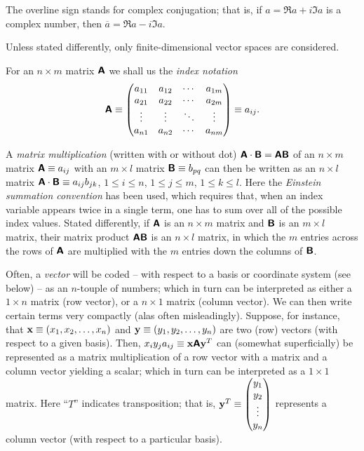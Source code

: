 The overline sign stands for complex conjugation; that is,
if
${a}= \Re a +i\Im a $ is a complex number, then
$\overline{a}= \Re a -i\Im a$.

Unless stated differently, only
finite-dimensional vector spaces are considered.

For an $n \times m$ matrix $\textsf{\textbf{A}}$ we shall us the {\em index notation}
\begin{equation}
\textsf{\textbf{A}}
\equiv
\begin{pmatrix}
a_{11}&a_{12}& \cdots & a_{1m}\\
a_{21}&a_{22}& \cdots & a_{2m}\\
\vdots &\vdots & \ddots & \vdots \\
a_{n1}&a_{n2}& \cdots & a_{nm}
\end{pmatrix}
\equiv a_{ij}
.
\end{equation}

A {\em matrix multiplication}
 (written with or without dot)
$\textsf{\textbf{A}} \cdot \textsf{\textbf{B}} = \textsf{\textbf{A}}  \textsf{\textbf{B}}$
of an $n \times m$ matrix $\textsf{\textbf{A}}\equiv a_{ij}$
with an $m \times l$ matrix $\textsf{\textbf{B}}\equiv b_{pq}$
can then be written as an $n \times l$ matrix
$\textsf{\textbf{A}} \cdot \textsf{\textbf{B}} \equiv a_{ij}b_{jk}$,
$1\le i\le n$,
$1\le j\le m$,
$1\le k\le l$.
Here the {\em Einstein summation convention}
 has been used,
which requires that, when an index variable appears twice in a single term, one has to
sum over all of the possible index values.
Stated differently, if $\textsf{\textbf{A}}$ is an $n \times m$ matrix and $\textsf{\textbf{B}}$ is an $m \times l$ matrix,
their matrix product $\textsf{\textbf{A}}\textsf{\textbf{B}}$ is an $n \times l$ matrix, in which the $m$
entries across the rows of $\textsf{\textbf{A}}$ are multiplied with the $m$ entries down the columns of $\textsf{\textbf{B}}$.

Often, a {\em vector} will be coded -- with respect to a basis or coordinate system (see below) -- as an $n$-touple of numbers;
which in turn can be interpreted as either a $1 \times n$ matrix (row vector),
or a $n \times 1$ matrix (column vector).
We can then write certain terms very compactly (alas often misleadingly).
Suppose, for instance, that
${\bf x}\equiv (x_1, x_2,\ldots ,x_n)$
and
${\bf y}\equiv (y_1, y_2,\ldots ,y_n)$
are two (row) vectors (with respect to a given basis).
Then, $x_iy_j a_{ij}\equiv {\bf x} \textsf{\textbf{A}} {\bf y}^T$ can (somewhat superficially) be represented as a matrix multiplication of
a row vector with a matrix and a column vector  yielding a scalar; which in turn can be interpreted as a $1 \times 1$ matrix.
Here ``$T$'' indicates transposition; that is,
${\bf y}^T\equiv \begin{pmatrix}
y_1\\
y_2\\
\vdots \\
y_n
\end{pmatrix}
$ represents a column vector (with respect to a particular basis).


